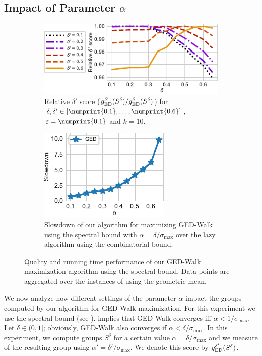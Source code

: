 \subsection{Impact of Parameter $\alpha$}
\label{sec:ged-walk:impact-of-alpha}
%
\begin{figure}[tb]
\centering

\begin{subfigure}[t]{.55\textwidth}
\centering
\includegraphics{./sources/plots/ged-walk/delta-relative-score.pdf}
\caption{Relative $\delta'$ score
(\ie $g_{\text{ED}}^{\delta'}(S^{\delta}) / g_{\text{ED}}^{\delta}(S^{\delta})$) for
$\delta,\delta' \in [\numprint{0.1}, \ldots, \numprint{0.6}]$,
$\epsilon = \numprint{0.1}$ and $k = 10$.}
\label{fig:ged-walk:delta-rel-score}
\end{subfigure}\hfill
\begin{subfigure}[t]{.4\textwidth}
\centering
\includegraphics{./sources/plots/ged-walk/delta-run-time.pdf}
\caption{Slowdown of our algorithm for maximizing GED-Walk using
the spectral bound with $\alpha = \delta/\sigma_{\max}$ over
the lazy algorithm using the combinatorial bound.}
\label{fig:ged-walk:delta-slowdown}
\end{subfigure}\hfill

\caption{Quality and running time performance of our GED-Walk maximization
algorithm using the spectral bound. Data points are aggregated over the instances
of  using the geometric mean.}
\label{fig:ged-walk:alpha-impact}
\end{figure}

We now analyze how different settings of the parameter $\alpha$ impact the
groups computed by our algorithm for GED-Walk maximization. For this experiment
we use the spectral bound (see ).
 implies that GED-Walk converges iff
$\alpha < 1/\sigma_{\max}$. Let $\delta \in (0, 1]$; obviously, GED-Walk also
converges if $\alpha < \delta / \sigma_{\max}$. In this experiment, we compute
groups $S^{\delta}$ for a certain value $\alpha = \delta/\sigma_{\max}$
and we measure of the resulting group using $\alpha' = \delta'/\sigma_{\max}$.
We denote this score by $g_{\text{ED}}^{\delta'}(S^{\delta})$.


